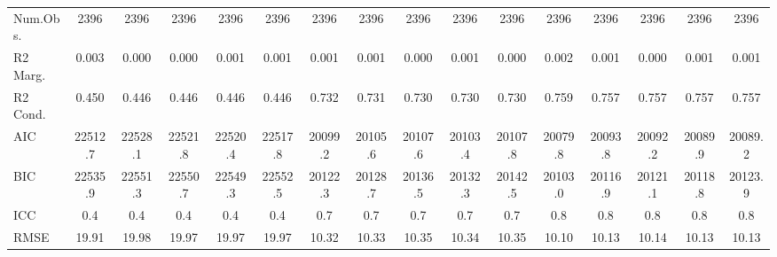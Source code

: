 \documentclass[]{report}
\begin{document}
\begin{table}
{\begin{tabular}[t]{lccccccccccccccc}
		\midrule
		Num.Obs. & \num{2396} & \num{2396} & \num{2396} & \num{2396} & \num{2396} & \num{2396} & \num{2396} & \num{2396} & \num{2396} & \num{2396} & \num{2396} & \num{2396} & \num{2396} & \num{2396} & \num{2396}\\
		R2 Marg. & \num{0.003} & \num{0.000} & \num{0.000} & \num{0.001} & \num{0.001} & \num{0.001} & \num{0.001} & \num{0.000} & \num{0.001} & \num{0.000} & \num{0.002} & \num{0.001} & \num{0.000} & \num{0.001} & \num{0.001}\\
		R2 Cond. & \num{0.450} & \num{0.446} & \num{0.446} & \num{0.446} & \num{0.446} & \num{0.732} & \num{0.731} & \num{0.730} & \num{0.730} & \num{0.730} & \num{0.759} & \num{0.757} & \num{0.757} & \num{0.757} & \num{0.757}\\
		AIC & \num{22512.7} & \num{22528.1} & \num{22521.8} & \num{22520.4} & \num{22517.8} & \num{20099.2} & \num{20105.6} & \num{20107.6} & \num{20103.4} & \num{20107.8} & \num{20079.8} & \num{20093.8} & \num{20092.2} & \num{20089.9} & \num{20089.2}\\
		BIC & \num{22535.9} & \num{22551.3} & \num{22550.7} & \num{22549.3} & \num{22552.5} & \num{20122.3} & \num{20128.7} & \num{20136.5} & \num{20132.3} & \num{20142.5} & \num{20103.0} & \num{20116.9} & \num{20121.1} & \num{20118.8} & \num{20123.9}\\
		ICC & \num{0.4} & \num{0.4} & \num{0.4} & \num{0.4} & \num{0.4} & \num{0.7} & \num{0.7} & \num{0.7} & \num{0.7} & \num{0.7} & \num{0.8} & \num{0.8} & \num{0.8} & \num{0.8} & \num{0.8}\\
		RMSE & \num{19.91} & \num{19.98} & \num{19.97} & \num{19.97} & \num{19.97} & \num{10.32} & \num{10.33} & \num{10.35} & \num{10.34} & \num{10.35} & \num{10.10} & \num{10.13} & \num{10.14} & \num{10.13} & \num{10.13}\\
		\bottomrule
	\end{tabular}}
\end{table}
\end{document}
